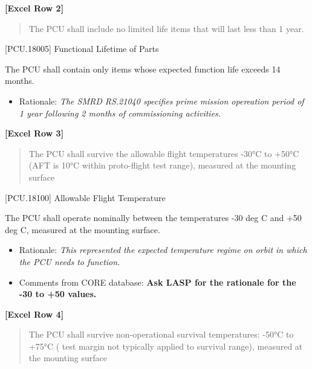 
\def\myauthor{Craig Hutchinson}
\def\mytitle{Flow-down of LASP PCU requirements dated 28FEB2018 to PCU ICD requirements}
\def\mydate{17 April 2018}


\textbf{[Excel Row 2]}

\begin{quote}
The PCU shall include no limited life items that will last less than 1 year.
\end{quote}

[PCU.18005] Functional Lifetime of Parts

The PCU shall contain only items whose expected function life exceeds 14 months.

\begin{itemize}
\item{} Rationale: \emph{The SMRD RS.21040 specifies prime mission opereation period of 1 year following 2 months of commissioning activities.}

\end{itemize}

\textbf{[Excel Row 3]}

\begin{quote}
The PCU shall survive the allowable flight temperatures -30°C to +50°C (AFT is 10°C within proto-flight test range), measured at the mounting surface
\end{quote}

[PCU.18100] Allowable Flight Temperature

The PCU shall operate nominally between the temperatures -30 deg C and +50 deg C, measured at the mounting surface.

\begin{itemize}
\item{} Rationale: \emph{This represented the expected temperature regime on orbit in which the PCU needs to function.}

\item{} Comments from CORE database: \textbf{Ask LASP for the rationale for the -30 to +50 values.}

\end{itemize}

\textbf{[Excel Row 4]}

\begin{quote}
The PCU shall survive non-operational survival temperatures: -50°C to +75°C ( test margin not typically applied to survival range), measured at the mounting surface
\end{quote}

